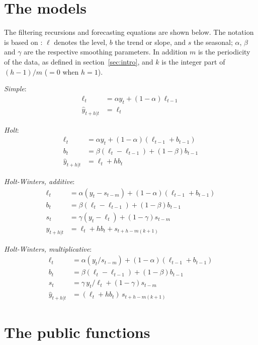 \documentclass{article}
\begin{document}
\section{The models}
\label{sec:models}

The filtering recursions and forecasting equations are shown below. The
notation is based on \citet[chapter 8]{hyndman2021}: $\ell$ denotes the
level, $b$ the trend or slope, and $s$ the seasonal; $\alpha$, $\beta$
and $\gamma$ are the respective smoothing parameters. In addition $m$
is the periodicity of the data, as defined in section~\ref{sec:intro},
and $k$ is the
integer part of $(h-1)/m$ ($=0$ when $h=1$).

\textit{Simple}:
\begin{align*}
  \ell_t &= \alpha y_t + (1-\alpha) \ell_{t-1}\\
  \hat{y}_{t+h|t} &= \ell_t
\end{align*}

\textit{Holt}:
\begin{align*}
  \ell_t &= \alpha y_t + (1-\alpha) (\ell_{t-1} + b_{t-1})\\
  b_t &= \beta (\ell_t - \ell_{t-1}) + (1-\beta) b_{t-1}\\
  \hat{y}_{t+h|t} &= \ell_t + hb_t
\end{align*}

\textit{Holt-Winters, additive}:
\begin{align*}
  \ell_t &= \alpha (y_t - s_{t-m}) + (1-\alpha) (\ell_{t-1} + b_{t-1})\\
  b_t &= \beta (\ell_t - \ell_{t-1}) + (1-\beta) b_{t-1}\\
  s_t &= \gamma (y_t - \ell_t) + (1-\gamma) s_{t-m}\\
  \hat{y}_{t+h|t} &= \ell_t + hb_t + s_{t+h-m(k+1)}
\end{align*}

\textit{Holt-Winters, multiplicative}:
\begin{align*}
  \ell_t &= \alpha (y_t / s_{t-m}) + (1-\alpha) (\ell_{t-1} + b_{t-1})\\
  b_t &= \beta (\ell_t - \ell_{t-1}) + (1-\beta) b_{t-1}\\
  s_t &= \gamma\, y_t / \ell_t + (1-\gamma) s_{t-m}\\
  \hat{y}_{t+h|t} &= (\ell_t + hb_t)\, s_{t+h-m(k+1)}
\end{align*}

\section{The public functions}
\label{sec:public}
\end{document}
